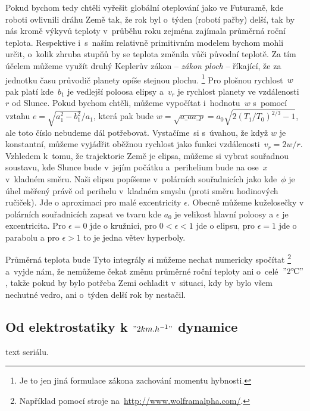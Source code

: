 \documentclass[twoside,fykos]{fksserie}
\begin{document}
Pokud bychom tedy chtěli vyřešit globální oteplování jako ve Futuramě,
kde roboti ovlivnili dráhu Země tak, že rok byl o~týden (robotí pařby)
delší, tak by nás kromě výkyvů teploty v~průběhu roku zejména zajímala
průměrná roční teplota. Respektive i~s~naším relativně primitivním modelem
bychom mohli určit, o~kolik zhruba stupňů by se teplota změnila vůči 
původní teplotě. Za tím účelem můžeme využít druhý Keplerův zákon -- {\it zákon
ploch} -- říkající, že za jednotku času průvodič planety opíše stejnou plochu.%
\footnote{Je to jen jiná formulace zákona zachování momentu hybnosti.}
Pro plošnou rychlost~$w$ pak platí
kde~$b_1$ je vedlejší poloosa elipsy a~$v_r$ je rychlost planety ve 
vzdálenosti~$r$ od Slunce. Pokud bychom chtěli, můžeme vypočítat
i~hodnotu~$w$ s~pomocí vztahu $e = {\sqrt{a_1^2 - b_1^2}}/{a_1}$, 
která pak bude $w = \sqrt{a\_a a\_p} = a_0 
\sqrt{2 \left( {T_1}/{T_0} \right) ^{2/3} -1 }$, ale toto číslo
nebudeme dál potřebovat. Vystačíme~si s~úvahou, že když $w$ je 
konstantní, můžeme vyjádřit oběžnou rychlost jako funkci vzdálenosti~$v_r =
{2w}/{r}$.
Vzhledem k~tomu, že trajektorie Země je elipsa,
můžeme si vybrat souřadnou soustavu, kde Slunce bude v~jejím počátku
a~perihelium bude na ose~$x$ v~kladném směru. Naši elipsu popíšeme v~polárních 
souřadnicích jako 
kde~$\phi$ je úhel měřený právě od perihelu v~kladném smyslu (proti směru 
hodinových ručiček). Jde o aproximaci pro malé excentricity $\epsilon$. 
Obecně můžeme kuželosečky v polárních souřadnicích zapsat ve tvaru 
kde $a_0$ je velikost hlavní poloosy a $\epsilon$ je excentricita. Pro 
$\epsilon=0$ jde o kružnici, pro $0<\epsilon<1$ jde o elipsu, pro 
$\epsilon=1$ jde o parabolu a pro $\epsilon>1$ to je jedna větev hyperboly.

Průměrná teplota bude 
Tyto integrály si můžeme nechat numericky spočítat%
\footnote{Například pomocí stroje na~\url{http://www.wolframalpha.com/}.}
a~vyjde nám, že nemůžeme čekat změnu průměrné roční teploty ani o~celé~$"2 ^\circ\mskip-2mu\mathrm{C}"$, 
takže pokud by bylo potřeba Zemi ochladit v~situaci, kdy by bylo všem 
nechutné vedro, ani o~týden delší rok by nestačil.



\subsection[Od elektrostatiky k 2 km/h dynamice]{Od elektrostatiky k $"2 km.h^{-1}"$ dynamice}
text seriálu.
\end{document}
